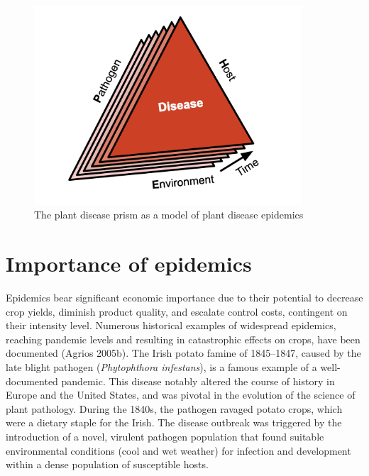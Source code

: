 \documentclass[
  letterpaper,
]{book}
\begin{document}
\begin{figure}

{\centering \includegraphics[width=3.92708in,height=\textheight]{imgs/prism.png}

}

\caption{\label{fig-prism}The plant disease prism as a model of plant
disease epidemics}

\end{figure}

\hypertarget{importance-of-epidemics}{%
\section{Importance of epidemics}\label{importance-of-epidemics}}

Epidemics bear significant economic importance due to their potential to
decrease crop yields, diminish product quality, and escalate control
costs, contingent on their intensity level. Numerous historical examples
of widespread epidemics, reaching pandemic levels and resulting in
catastrophic effects on crops, have been documented (Agrios 2005b). The
Irish potato famine of 1845--1847, caused by the late blight pathogen
(\emph{Phytophthora infestans}), is a famous example of a
well-documented pandemic. This disease notably altered the course of
history in Europe and the United States, and was pivotal in the
evolution of the science of plant pathology. During the 1840s, the
pathogen ravaged potato crops, which were a dietary staple for the
Irish. The disease outbreak was triggered by the introduction of a
novel, virulent pathogen population that found suitable environmental
conditions (cool and wet weather) for infection and development within a
dense population of susceptible hosts.
\end{document}
